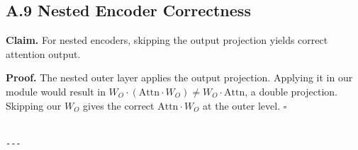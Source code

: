 \subsection{A.9 Nested Encoder Correctness}

\textbf{Claim.} For nested encoders, skipping the output projection yields correct 
attention output.

\textbf{Proof.} The nested outer layer applies the output projection. Applying it 
in our module would result in $W_O \cdot (\text{Attn} \cdot W_O) \neq W_O \cdot \text{Attn}$, 
a double projection. Skipping our $W_O$ gives the correct 
$\text{Attn} \cdot W_O$ at the outer level. $\square$
\begin{lstlisting}

---
\end{lstlisting}